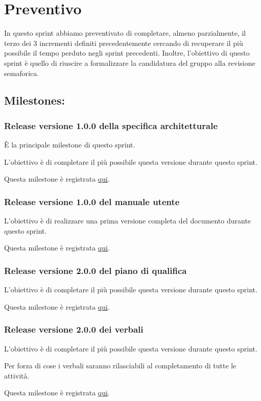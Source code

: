\section{Preventivo}

In questo sprint abbiamo preventivato di completare, almeno parzialmente, il terzo dei 3 incrementi definiti precedentemente cercando di recuperare il più possibile il tempo perduto negli sprint precedenti. Inoltre, l'obiettivo di questo sprint è quello di riuscire a formalizzare la candidatura del gruppo alla revisione semaforica.

\subsection{Milestones:}  

\subsubsection{Release versione 1.0.0 della specifica architetturale}

È la principale milestone di questo sprint.

L'obiettivo è di completare il più possibile questa versione durante questo sprint.

Questa milestone è registrata \href{https://github.com/SWEasabi/specifica-architetturale/milestone/1}{qui}.

\subsubsection{Release versione 1.0.0 del manuale utente}

L'obiettivo è di realizzare una prima versione completa del documento durante questo sprint.

Questa milestone è registrata \href{https://github.com/SWEasabi/manuale-utente/milestone/1}{qui}.

\subsubsection{Release versione 2.0.0 del piano di qualifica}

L'obiettivo è di completare il più possibile questa versione durante questo sprint.

Questa milestone è registrata \href{https://github.com/SWEasabi/piano-di-qualifica/milestone/3}{qui}.

\subsubsection{Release versione 2.0.0 dei verbali}

L'obiettivo è di completare il più possibile questa versione durante questo sprint.

Per forza di cose i verbali saranno rilasciabili al completamento di tutte le attività.

Questa milestone è registrata \href{https://github.com/SWEasabi/verbali/milestone/1}{qui}.